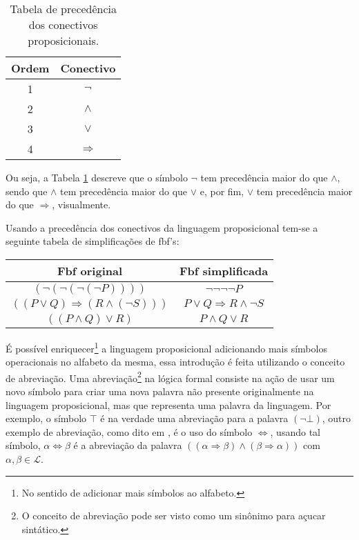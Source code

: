 \begin{table}[H]
  \centering
  \begin{tabular}{cc}
    \hline
    Ordem & Conectivo\\
    \hline 
    1 & $\neg$\\
    2 & $\land$\\
    3 & $\lor$\\
    4 & $\Rightarrow$\\
    \hline
  \end{tabular}
  \caption{Tabela de precedência dos conectivos proposicionais.}
  \label{tab:PrecedenciaProposicional}
\end{table}

Ou seja, a Tabela \ref{tab:PrecedenciaProposicional} descreve que o símbolo $\neg$ tem precedência maior do que $\land$, sendo que $\land$ tem precedência maior do que $\lor$ e, por fim, $\lor$ tem precedência maior do que $\Rightarrow$, visualmente.

\begin{exemplo}\label{exe:}
  Usando a precedência dos conectivos da linguagem proposicional tem-se a seguinte tabela de simplificações de fbf's:

  \begin{table}[H]
    \centering
    \begin{tabular}{cc}
      \hline
      Fbf original & Fbf simplificada\\
      \hline
      $(\neg (\neg (\neg (\neg P))))$ & $\neg \neg \neg \neg P$\\
      $((P \lor Q) \Rightarrow (R \land (\neg S)))$ & $P \lor Q \Rightarrow R \land \neg S$\\
      $((P \land Q) \lor R)$ & $P \land Q \lor R$\\
      \hline
    \end{tabular}
  \end{table}
\end{exemplo}

É possível enriquecer\footnote{No sentido de adicionar mais símbolos ao alfabeto.} a linguagem proposicional adicionando mais símbolos operacionais no alfabeto da mesma, essa introdução é feita utilizando o conceito de abreviação. Uma abreviação\footnote{O conceito de abreviação pode ser visto como um sinônimo para açucar sintático.} na lógica formal consiste na ação de usar um novo símbolo para criar uma nova palavra não presente originalmente na linguagem proposicional, mas que representa uma palavra da linguagem. Por exemplo, o símbolo $\top$ é na verdade uma abreviação para a palavra $(\neg \bot)$, outro exemplo de abreviação, como dito em \cite{joaoPavao2014}, é o uso do símbolo $\Leftrightarrow$, usando tal símbolo, $\alpha \Leftrightarrow \beta$ é a abreviação  da palavra $((\alpha \Rightarrow \beta) \land (\beta \Rightarrow \alpha))$ com $\alpha, \beta \in \mathcal{L}$.

